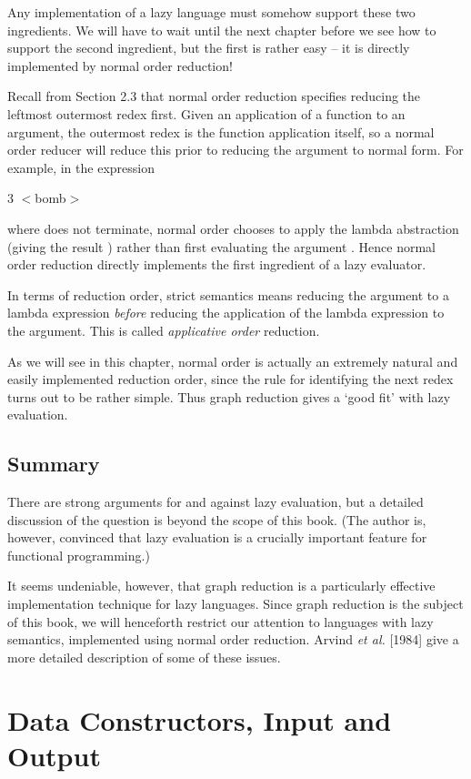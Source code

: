Any implementation of a lazy language must somehow support these two
ingredients. We will have to wait until the next chapter before we see how to
support the second ingredient, but the first is rather easy – it is directly
implemented by normal order reduction!

Recall from Section 2.3 that normal order reduction specifies reducing the
leftmost outermost redex first. Given an application of a function to an
argument, the outermost redex is the function application itself, so a normal
order reducer will reduce this prior to reducing the argument to normal form.
For example, in the expression
\begin{mlcoded}
    3 $<$bomb$>$
\end{mlcoded}
where  does not terminate, normal order chooses to apply the
lambda abstraction (giving the result ) rather than first evaluating the
argument . Hence normal order reduction directly implements the
first ingredient of a lazy evaluator.

In terms of reduction order, strict semantics means reducing the argument
to a lambda expression \textit{before} reducing the application of the lambda
expression to the argument. This is called \textit{applicative order} reduction.

As we will see in this chapter, normal order is actually an extremely natural
and easily implemented reduction order, since the rule for identifying the next
redex turns out to be rather simple. Thus graph reduction gives a `good fit'
with lazy evaluation.

\subsection{Summary}

There are strong arguments for and against lazy evaluation, but a detailed
discussion of the question is beyond the scope of this book. (The author is,
however, convinced that lazy evaluation is a crucially important feature for
functional programming.)

It seems undeniable, however, that graph reduction is a particularly
effective implementation technique for lazy languages. Since graph reduction
is the subject of this book, we will henceforth restrict our attention to
languages with lazy semantics, implemented using normal order reduction.
Arvind \textit{et al.} [1984] give a more detailed description of some of these issues.

\section{Data Constructors, Input and Output}

